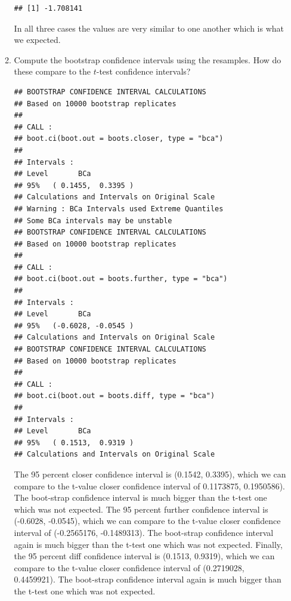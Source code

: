 \documentclass{article}\usepackage[]{graphicx}\usepackage[]{xcolor}
\makeatletter
\newenvironment{kframe}{%
 \def\at@end@of@kframe{}%
 \ifinner\ifhmode%
  \def\at@end@of@kframe{\end{minipage}}%
  \begin{minipage}{\columnwidth}%
 \fi\fi%
 \def\FrameCommand##1{\hskip\@totalleftmargin \hskip-\fboxsep
 \colorbox{shadecolor}{##1}\hskip-\fboxsep
     \hskip-\linewidth \hskip-\@totalleftmargin \hskip\columnwidth}%
 \MakeFramed {\advance\hsize-\width
   \@totalleftmargin\z@ \linewidth\hsize
   \@setminipage}}%
 {\par\unskip\endMakeFramed%
 \at@end@of@kframe}
\newenvironment{knitrout}{}{} %
\makeatother
\begin{document}
\begin{enumerate}
\begin{enumerate}
\begin{knitrout}
\begin{kframe}
\begin{verbatim}
## [1] -1.708141
\end{verbatim}
\end{kframe}
\end{knitrout}
In all three cases the values are very similar to one another which is what we expected.
  \item Compute the bootstrap confidence intervals using the resamples. How do these 
  compare to the $t$-test confidence intervals?
\begin{knitrout}
\color{fgcolor}\begin{kframe}
\begin{verbatim}
## BOOTSTRAP CONFIDENCE INTERVAL CALCULATIONS
## Based on 10000 bootstrap replicates
## 
## CALL : 
## boot.ci(boot.out = boots.closer, type = "bca")
## 
## Intervals : 
## Level       BCa          
## 95%   ( 0.1455,  0.3395 )  
## Calculations and Intervals on Original Scale
## Warning : BCa Intervals used Extreme Quantiles
## Some BCa intervals may be unstable
## BOOTSTRAP CONFIDENCE INTERVAL CALCULATIONS
## Based on 10000 bootstrap replicates
## 
## CALL : 
## boot.ci(boot.out = boots.further, type = "bca")
## 
## Intervals : 
## Level       BCa          
## 95%   (-0.6028, -0.0545 )  
## Calculations and Intervals on Original Scale
## BOOTSTRAP CONFIDENCE INTERVAL CALCULATIONS
## Based on 10000 bootstrap replicates
## 
## CALL : 
## boot.ci(boot.out = boots.diff, type = "bca")
## 
## Intervals : 
## Level       BCa          
## 95%   ( 0.1513,  0.9319 )  
## Calculations and Intervals on Original Scale
\end{verbatim}
\end{kframe}
\end{knitrout}
The 95 percent closer confidence interval is (0.1542, 0.3395), which we can compare to the t-value closer confidence interval of 0.1173875, 0.1950586). The boot-strap confidence interval is much bigger than the t-test one which was not expected. The 95 percent further confidence interval is (-0.6028, -0.0545), which we can compare to the t-value closer confidence interval of (-0.2565176, -0.1489313). The boot-strap confidence interval again is much bigger than the t-test one which was not expected. Finally, the 95 percent diff confidence interval is (0.1513, 0.9319), which we can compare to the t-value closer confidence interval of (0.2719028, 0.4459921). The boot-strap confidence interval again is much bigger than the t-test one which was not expected.


\end{enumerate}
\end{enumerate}
\end{document}
